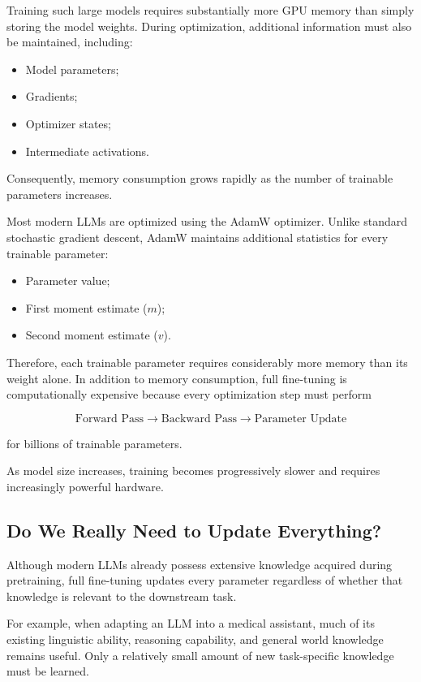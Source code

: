 Training such large models requires substantially more GPU memory than simply storing the model weights. During optimization, additional information must also be maintained, including:

\begin{itemize}
    \item Model parameters;
    \item Gradients;
    \item Optimizer states;
    \item Intermediate activations.
\end{itemize}

Consequently, memory consumption grows rapidly as the number of trainable parameters increases.

Most modern LLMs are optimized using the AdamW optimizer. Unlike standard stochastic gradient descent, AdamW maintains additional statistics for every trainable parameter:

\begin{itemize}
    \item Parameter value;
    \item First moment estimate ($m$);
    \item Second moment estimate ($v$).
\end{itemize}

Therefore, each trainable parameter requires considerably more memory than its weight alone.
In addition to memory consumption, full fine-tuning is computationally expensive because every optimization step must perform

\[
\text{Forward Pass}
\longrightarrow
\text{Backward Pass}
\longrightarrow
\text{Parameter Update}
\]

for billions of trainable parameters.

As model size increases, training becomes progressively slower and requires increasingly powerful hardware.

\subsection*{Do We Really Need to Update Everything?}

Although modern LLMs already possess extensive knowledge acquired during pretraining, full fine-tuning updates every parameter regardless of whether that knowledge is relevant to the downstream task.

For example, when adapting an LLM into a medical assistant, much of its existing linguistic ability, reasoning capability, and general world knowledge remains useful. Only a relatively small amount of new task-specific knowledge must be learned.

